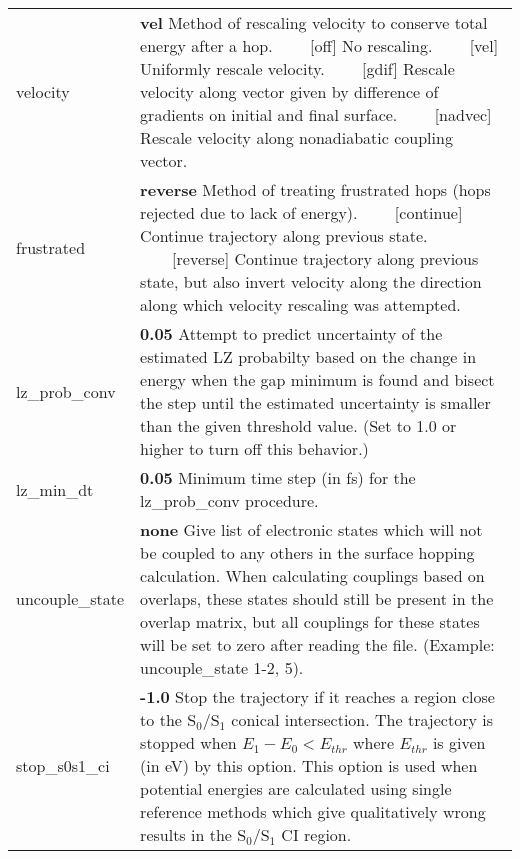 \documentclass{report}
\newcommand{\tabitem}{~~\llap{--}~~}
\begin{document}
\begin{tabularx}{\textwidth}{ m{2.5cm} X }
velocity		&
	\textbf{vel} \newline
	Method of rescaling velocity to conserve total energy after a hop. \newline
	\tabitem [off] No rescaling. \newline
	\tabitem [vel] Uniformly rescale velocity. \newline
	\tabitem [gdif] Rescale velocity along vector given by difference of gradients on initial and final surface. \newline
	\tabitem [nadvec] Rescale velocity along nonadiabatic coupling vector. \\

frustrated		&
	\textbf{reverse} \newline
	Method of treating frustrated hops (hops rejected due to lack of energy). \newline
	\tabitem [continue] Continue trajectory along previous state. \newline
	\tabitem [reverse] Continue trajectory along previous state, but also invert velocity along the direction along which velocity rescaling was attempted. \\

lz\_prob\_conv	&
	\textbf{0.05} \newline
	Attempt to predict uncertainty of the estimated LZ probabilty based on the change in energy when the gap minimum is found and bisect the step until the estimated uncertainty is smaller than the given threshold value. (Set to 1.0 or higher to turn off this behavior.) \\

lz\_min\_dt	&
	\textbf{0.05} \newline
    Minimum time step (in fs) for the lz\_prob\_conv procedure. \\

uncouple\_state		&
	\textbf{none} \newline
	Give list of electronic states which will not be coupled to any others in the surface hopping calculation. When calculating couplings based on overlaps, these states should still be present in the overlap matrix, but all couplings for these states will be set to zero after reading the file. (Example: uncouple\_state 1-2, 5). \\

stop\_s0s1\_ci &
    \textbf{-1.0} \newline
    Stop the trajectory if it reaches a region close to the S$_0$/S$_1$ conical intersection. The trajectory is stopped when $E_1 - E_0 < E_{thr}$ where $E_{thr}$ is given (in eV) by this option. This option is used when potential energies are calculated using single reference methods which give qualitatively wrong results in the S$_0$/S$_1$ CI region. \\
\end{tabularx}
\end{document}
